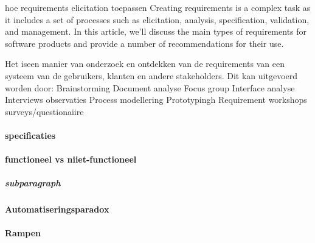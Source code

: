 hoe requirements elicitation toepassen 
Creating requirements is a complex task as it includes a set of processes such as elicitation, analysis, specification, validation, and management. In this article, we’ll discuss the main types of requirements for software products and provide a number of recommendations for their use.

Het iseen manier van onderzoek en ontdekken van de requirements van een systeem van de gebruikers, klanten en andere stakeholders.
Dit kan uitgevoerd worden door:
Brainstorming
Document analyse
Focus group
Interface analyse
Interviews observaties
Process modellering
Prototypingh
Requirement workshops
surveys/questionaiire

\paragraph{specificaties}

\paragraph{functioneel vs niiet-functioneel}


\subparagraph{subparagraph}


\paragraph{Automatiseringsparadox}



\paragraph{Rampen}



